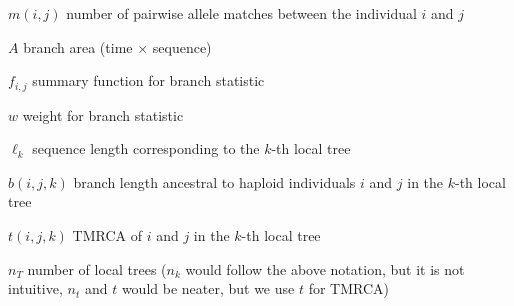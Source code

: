 $m(i,j)$ number of pairwise allele matches between the individual $i$ and $j$

$A$ branch area (time $\times$ sequence)

$f_{i,j}$ summary function for branch statistic

$w$ weight for branch statistic

$\ell_k$ sequence length corresponding to the $k$-th local tree

$b(i,j,k)$ branch length ancestral to haploid individuals $i$ and $j$ in the $k$-th local tree

$t(i,j,k)$ TMRCA of $i$ and $j$ in the $k$-th local tree

$n_T$ number of local trees ($n_k$ would follow the above notation, but it is not intuitive, $n_t$ and $t$ would be neater, but we use $t$ for TMRCA)
